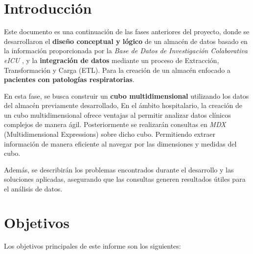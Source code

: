 \documentclass[12pt, a4paper, twoside]{article}
\begin{document}
	
	
	
	\clearpage
	\setcounter{page}{1}
	
	
	
	\tableofcontents
	\newpage
	
	\section{Introducción}
	
	Este documento es una continuación de las fases anteriores del proyecto, donde se desarrollaron el \textbf{diseño conceptual y lógico} de un almacén de datos basado en la información proporcionada por la \textit{Base de Datos de Investigación Colaborativa eICU} \cite{eICU2024}, y la \textbf{integración de datos} mediante un proceso de Extracción, Transformación y Carga (ETL). Para la creación de un almacén enfocado a \textbf{pacientes con patologías respiratorias}.
	
	En esta fase, se busca construir un \textbf{cubo multidimensional} utilizando los datos del almacén previamente desarrollado,	En el ámbito hospitalario, la creación de un cubo multidimensional ofrece ventajas al permitir analizar datos clínicos complejos de manera ágil. Posteriormente se realizarán consultas en \textit{MDX} (Multidimensional Expressions) sobre dicho cubo.  Permitiendo extraer información de manera eficiente al navegar por las dimensiones y medidas del cubo.

	
	Además, se describirán los problemas encontrados durante el desarrollo y las soluciones aplicadas, asegurando que las consultas generen resultados útiles para el análisis de datos.
	
	
	
	\section{Objetivos}
	
	Los objetivos principales de este informe son los siguientes:
	
\end{document}
